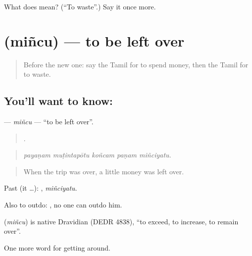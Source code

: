 \begin{tcolorbox}[breakable,colback=teal!4,colframe=teal!35!black,title={Before you move on}]
What does  mean? (\textquotedblleft{}To waste\textquotedblright{}.) Say it once more.
\end{tcolorbox}
\section[\texorpdfstring{\ta{மிஞ்சு} (miñcu)}{மிஞ்சு (miñcu)}]{ (miñcu) — to be left over}

\label{lesson:TA-C448-mincu}



\begin{quote}
Before the new one: say the Tamil for to spend money, then the Tamil for to waste.
\end{quote}

\subsection*{You'll want to know: }
\textbf{} — \emph{miñcu} — \textquotedblleft{}to be left over\textquotedblright{}.

\begin{quote}
    .
\end{quote}

\begin{quote}
\emph{payaṇam muṭintapōtu koñcam paṇam miñciyatu.}
\end{quote}

\begin{quote}
When the trip was over, a little money was left over.
\end{quote}

Past (it …): , \emph{miñciyatu}.

Also to outdo:    , no one can outdo him.

\begin{cousinweb}
\textbf{} (\emph{miñcu}) is native Dravidian (DEDR 4838), \textquotedblleft{}to exceed, to increase, to remain over\textquotedblright{}.
\end{cousinweb}

\begin{grammarlens}[title={What you've built}]
One more word for getting around.
\end{grammarlens}

